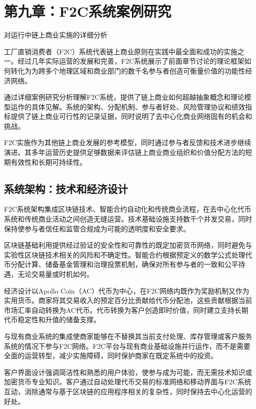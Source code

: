 \documentclass[
  Letterpaper,
]{scrbook}
\begin{document}
\chapter{第九章：F2C系统案例研究}\label{sec-f2c-case-study}

对运行中链上商业实施的详细分析

工厂直销消费者（F2C）系统代表链上商业原则在实践中最全面和成功的实施之一。经过几年实际运营的发展和完善，F2C系统展示了前面章节讨论的理论框架如何转化为为跨多个地理区域和商业部门的数千名参与者创造可衡量价值的功能性经济网络。

通过详细案例研究分析理解F2C系统，提供了链上商业如何超越抽象概念和理论模型运作的具体见解。系统的架构、分配机制、参与者好处、风险管理协议和绩效指标提供了链上商业可行性的记录证据，同时说明了去中心化商业网络固有的机会和挑战。

F2C实施作为其他链上商业发展的参考模型，同时通过参与者反馈和技术进步继续演进。其多年运营历史提供足够数据来评估链上商业商业组织和价值分配方法的短期有效性和长期可持续性。

\section{系统架构：技术和经济设计}\label{ux7cfbux7edfux67b6ux6784ux6280ux672fux548cux7ecfux6d4eux8bbeux8ba1}

F2C系统架构集成区块链技术、智能合约自动化和传统商业流程，在去中心化代币系统和传统商业活动之间创造无缝运营。技术基础设施支持数千个并发交易，同时保持使参与者信任和监管合规成为可能的透明度和安全要求。

区块链基础利用提供经过验证的安全性和可靠性的既定加密货币网络，同时避免与实验性区块链技术相关的风险和不确定性。智能合约根据预定义的数学公式处理代币分配计算、储备基金管理和治理投票机制，确保对所有参与者的一致和公平待遇，无论交易量或时机如何。

经济设计以Apollo
Coin（AC）代币为中心，在F2C网络内既作为奖励机制又作为实用货币。商家将其交易收入的预定百分比贡献给代币分配池，这些贡献根据当前市场汇率自动转换为AC代币。代币转换为客户创造即时价值，同时建立支持长期代币稳定性和升值的储备支撑。

与现有商业系统的集成使商家能够在不替换其当前支付处理、库存管理或客户服务系统的情况下参与F2C网络。F2C平台与现有商业基础设施并行运作，而不是需要全面的运营转型，减少实施障碍，同时保护商家在既定系统中的投资。

客户界面设计强调简洁性和熟悉的用户体验，使参与成为可能，而无需技术知识或加密货币专业知识。客户通过自动处理代币交易的标准网络和移动界面与F2C系统互动，消除通常与基于区块链的应用程序相关的复杂性，同时保持去中心化运营的好处。
\end{document}
